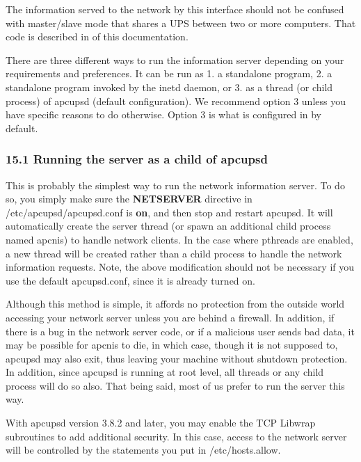 {{{{{{{{{{The information served to the network by this interface should not be confused
with master/slave mode that shares a UPS between two or more computers. That
code is described in 
 of this
documentation.  

There are three different ways to run the information server depending on your
requirements and preferences. It can be run as 1.  a standalone program, 2. a
standalone program invoked by the inetd daemon, or 3. as a thread (or child
process) of apcupsd (default configuration). We recommend option 3 unless you
have specific reasons to do otherwise. Option 3 is what is configured in by
default. 

\label{Running-the-server-as-a-child-of-apcupsd}

\subsubsection*{15.1 Running the server as a child of apcupsd}

This is probably the simplest way to run the network information server. To do
so, you simply make sure the {\bf NETSERVER} directive in
/etc/apcupsd/apcupsd.conf is {\bf on}, and then stop and restart apcupsd. It
will automatically create the server thread (or spawn an additional child
process named apcnis) to handle network clients. In the case where pthreads
are enabled, a new thread will be created rather than a child process to
handle the network information requests. Note, the above modification should
not be necessary if you use the default apcupsd.conf, since it is already
turned on.  

Although this method is simple, it affords no protection from the outside
world accessing your network server unless you are behind a firewall. In
addition, if there is a bug in the network server code, or if a malicious user
sends bad data, it may be possible for apcnis to die, in which case, though it
is not supposed to, apcupsd may also exit, thus leaving your machine without
shutdown protection. In addition, since apcupsd is running at root level, all
threads or any child process will do so also. That being said, most of us
prefer to run the server this way.  

With apcupsd version 3.8.2 and later, you may enable the TCP Libwrap
subroutines to add additional security. In this case, access to the network
server will be controlled by the statements you put in /etc/hosts.allow. 

}}}}}}}}}}
